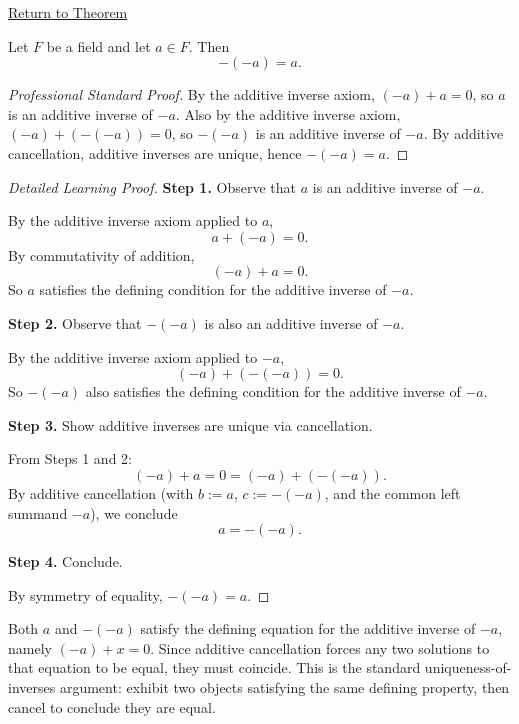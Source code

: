 \newpage
{}
\label{prf:double-negation}

\begin{remark*}[Return]
\hyperref[thm:double-negation]{Return to Theorem}
\end{remark*}

\begin{theorem*}
Let $F$ be a field and let $a\in F$.  Then
\[
-(-a) = a.
\]
\end{theorem*}

\begin{proof}[Professional Standard Proof]
\LRAProofBodyStart
By the additive inverse axiom, $(-a) + a = 0$, so $a$ is an additive
inverse of $-a$.  Also by the additive inverse axiom, $(-a) + (-(-a)) = 0$,
so $-(-a)$ is an additive inverse of $-a$.  By additive cancellation,
additive inverses are unique, hence $-(-a) = a$.
\end{proof}

\begin{proof}[Detailed Learning Proof]
\LRAProofBodyStart

\textbf{Step 1.} Observe that $a$ is an additive inverse of $-a$.

By the additive inverse axiom applied to $a$,
\[
a + (-a) = 0.
\]
By commutativity of addition,
\[
(-a) + a = 0.
\]
So $a$ satisfies the defining condition for the additive inverse of $-a$.

\textbf{Step 2.} Observe that $-(-a)$ is also an additive inverse of $-a$.

By the additive inverse axiom applied to $-a$,
\[
(-a) + (-(-a)) = 0.
\]
So $-(-a)$ also satisfies the defining condition for the additive inverse of $-a$.

\textbf{Step 3.} Show additive inverses are unique via cancellation.

From Steps 1 and 2:
\[
(-a) + a = 0 = (-a) + (-(-a)).
\]
By additive cancellation (with $b := a$, $c := -(-a)$, and the common
left summand $-a$), we conclude
\[
a = -(-a).
\]

\textbf{Step 4.} Conclude.

By symmetry of equality, $-(-a) = a$.
\end{proof}

\begin{remark*}
Both $a$ and $-(-a)$ satisfy the defining equation for the additive inverse
of $-a$, namely $(-a) + x = 0$.  Since additive cancellation forces any two
solutions to that equation to be equal, they must coincide.  This is the
standard uniqueness-of-inverses argument: exhibit two objects satisfying the
same defining property, then cancel to conclude they are equal.
\end{remark*}

